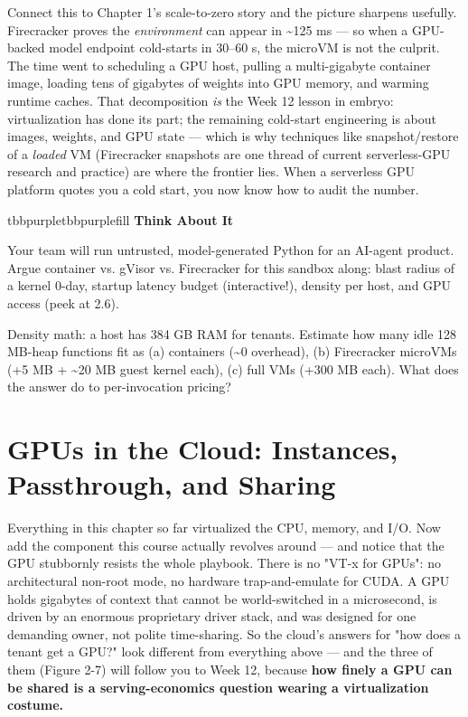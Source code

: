 Connect this to Chapter 1's scale-to-zero story and the picture sharpens usefully. Firecracker proves the \textit{environment} can appear in \textasciitilde{}125 ms — so when a GPU-backed model endpoint cold-starts in 30–60 s, the microVM is not the culprit. The time went to scheduling a GPU host, pulling a multi-gigabyte container image, loading tens of gigabytes of weights into GPU memory, and warming runtime caches. That decomposition \textit{is} the Week 12 lesson in embryo: virtualization has done its part; the remaining cold-start engineering is about images, weights, and GPU state — which is why techniques like snapshot/restore of a \textit{loaded} VM (Firecracker snapshots are one thread of current serverless-GPU research and practice) are where the frontier lies. When a serverless GPU platform quotes you a cold start, you now know how to audit the number.

\begin{calloutbox}{tbbpurple}{tbbpurplefill}
{\normalsize\bfseries\color{tbbpurple}Think About It}\par\vspace{3pt}
\begin{tbbitemize}
  \item Your team will run untrusted, model-generated Python for an AI-agent product. Argue container vs. gVisor vs. Firecracker for this sandbox along: blast radius of a kernel 0-day, startup latency budget (interactive!), density per host, and GPU access (peek at 2.6).
  \item Density math: a host has 384 GB RAM for tenants. Estimate how many idle 128 MB-heap functions fit as (a) containers (\textasciitilde{}0 overhead), (b) Firecracker microVMs (+5 MB + \textasciitilde{}20 MB guest kernel each), (c) full VMs (+300 MB each). What does the answer do to per-invocation pricing?
\end{tbbitemize}
\end{calloutbox}

\section{GPUs in the Cloud: Instances, Passthrough, and Sharing}

Everything in this chapter so far virtualized the CPU, memory, and I/O. Now add the component this course actually revolves around — and notice that the GPU stubbornly resists the whole playbook. There is no "VT-x for GPUs": no architectural non-root mode, no hardware trap-and-emulate for CUDA. A GPU holds gigabytes of context that cannot be world-switched in a microsecond, is driven by an enormous proprietary driver stack, and was designed for one demanding owner, not polite time-sharing. So the cloud's answers for "how does a tenant get a GPU?" look different from everything above — and the three of them (Figure 2-7) will follow you to Week 12, because \textbf{how finely a GPU can be shared is a serving-economics question wearing a virtualization costume.}


